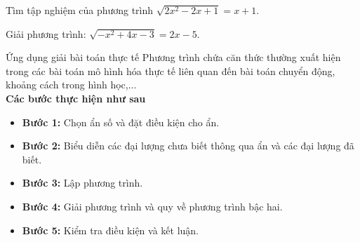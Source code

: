 \begin{vd}
	Tìm tập nghiệm của phương trình $\sqrt{2x^2 - 2x + 1} = x + 1$.
	\end{vd}
\begin{vd}
	Giải phương trình: $\sqrt{-x^2 + 4x - 3} = 2x - 5$.
\end{vd}
\begin{dang}{Ứng dụng giải bài toán thực tế}
Phương trình chứa căn thức thường xuất hiện trong các bài toán mô hình hóa thực tế liên quan đến bài toán chuyển động, khoảng cách trong hình học,...\\
\textbf{Các bước thực hiện như sau}
\begin{itemize}
	\item \textbf{Bước 1:} Chọn ẩn số và đặt điều kiện cho ẩn.
	\item \textbf{Bước 2:} Biểu diễn các đại lượng chưa biết thông qua ẩn và các đại lượng đã biết.
	\item \textbf{Bước 3:} Lập phương trình.
	\item \textbf{Bước 4:} Giải phương trình và quy về phương trình bậc hai.
	\item \textbf{Bước 5:} Kiểm tra điều kiện và kết luận.
\end{itemize}
\end{dang}

